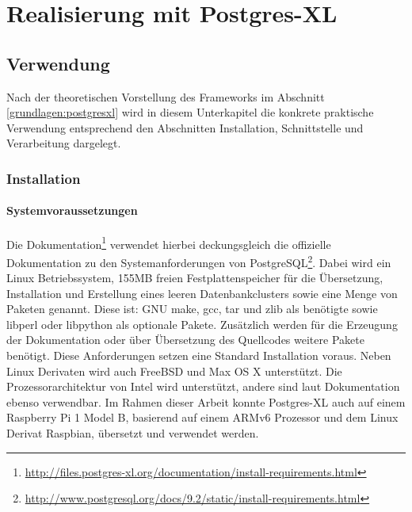 \chapter{Realisierung mit Postgres-XL}
\label{chapter:postgresxl}

\section{Verwendung}

Nach der theoretischen Vorstellung des Frameworks im Abschnitt \ref{grundlagen:postgresxl} wird in diesem Unterkapitel die konkrete praktische Verwendung entsprechend den Abschnitten Installation, Schnittstelle und Verarbeitung dargelegt.

\subsection{Installation}
\subsubsection{Systemvoraussetzungen}
Die Dokumentation\footnote{\url{http://files.postgres-xl.org/documentation/install-requirements.html}} verwendet hierbei deckungsgleich die offizielle Dokumentation zu den Systemanforderungen von PostgreSQL\footnote{\url{http://www.postgresql.org/docs/9.2/static/install-requirements.html}}.
Dabei wird ein Linux Betriebssystem, 155MB freien Festplattenspeicher für die Übersetzung, Installation und Erstellung eines leeren Datenbankclusters sowie eine Menge von Paketen genannt.
Diese ist: GNU make, gcc, tar und zlib als benötigte sowie libperl oder libpython als optionale Pakete.
Zusätzlich werden für die Erzeugung der Dokumentation oder über Übersetzung des Quellcodes weitere Pakete benötigt.
Diese Anforderungen setzen eine Standard Installation voraus.
Neben Linux Derivaten wird auch FreeBSD und Max OS X unterstützt.
Die Prozessorarchitektur von Intel wird unterstützt, andere sind laut Dokumentation ebenso verwendbar.
Im Rahmen dieser Arbeit konnte Postgres-XL auch auf einem Raspberry Pi 1 Model B, basierend auf einem ARMv6 Prozessor und dem Linux Derivat Raspbian, übersetzt und verwendet werden.

